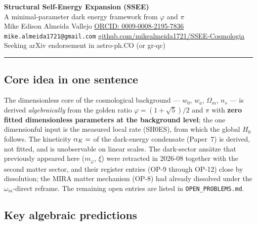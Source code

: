 \documentclass[11pt,a4paper]{article}
\begin{document}
\begin{center}
  {\Large\bfseries Structural Self-Energy Expansion (SSEE)}\\[4pt]
  {\large A minimal-parameter dark energy framework from $\varphi$ and $\pi$}\\[6pt]
  Mike Edison Almeida Vallejo \quad
  \href{https://orcid.org/0009-0008-2195-7836}{ORCID: 0009-0008-2195-7836}\\
  \texttt{mike.almeida1721@gmail.com} \quad
  \href{https://github.com/mikealmeida1721/SSEE-Cosmologia}{github.com/mikealmeida1721/SSEE-Cosmologia}\\[2pt]
  {\small\color{gray}Seeking arXiv endorsement in astro-ph.CO (or gr-qc)}
\end{center}

\hrule\vspace{6pt}

\subsection*{Core idea in one sentence}

The dimensionless core of the cosmological background — $w_0$, $w_a$, $\Omega_m$, $n_s$ — is derived \emph{algebraically} from the
golden ratio $\varphi=(1+\sqrt{5})/2$ and $\pi$ with \textbf{zero fitted dimensionless parameters at the background level}; the
one dimensionful input is the measured local rate (SH0ES), from which the global $H_0$ follows. The kineticity $\alpha_K=\val{alpha_K_z0_d6}$ of the dark-energy condensate (Paper~7) is
derived, not fitted, and is unobservable on linear scales. The dark-sector ans\"atze that previously appeared here ($m_\varphi$, $\xi$) were retracted in 2026-08 together with the second matter sector, and their register entries (OP-9 through OP-12) close by dissolution; the MIRA matter mechanism (OP-8) had already dissolved under the $\omega_m$-direct reframe. The remaining open entries are listed in \texttt{OPEN\_PROBLEMS.md}.

\subsection*{Key algebraic predictions}
\end{document}
